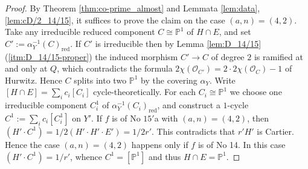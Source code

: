 \documentclass[a4paper,11pt]{amsart}
\theoremstyle{definition}
\theoremstyle{remark}
\numberwithin{equation}{section}
\newcommand{\bP}{{\mathbb P}}
\newcommand{\cO}{{\mathcal O}}
\newcommand{\red}{\mathrm{red}}
\begin{document}
\begin{proof}
By Theorem \ref{thm:co-prime_almost} and
Lemmata \ref{lem:data}, \ref{lem:cD/2_14/15},
it suffices to prove the claim on the case $(a,n)=(4,2)$.
Take any irreducible reduced component $C \cong \bP^1$ of $H \cap E$,
and set $C':=\alpha_Y^{-1}(C)_\red$.
If $C'$ is irreducible
then by Lemma \ref{lem:D_14/15}(\ref{itm:D_14/15-proper})
the induced morphism $C' \to C$ of degree $2$ is ramified at and only at $Q$,
which contradicts
the formula $2\chi(\cO_{C'})=2\cdot2\chi(\cO_C)-1$ of Hurwitz.
Hence $C$ splits into two $\bP^1$ by the covering $\alpha_Y$.
Write $[H \cap E]=\sum_ic_i[C_i]$ cycle-theoretically.
For each $C_i\cong\bP^1$
we choose one irreducible component $C_i^1$ of $\alpha_Y^{-1}(C_i)_\red$,
and construct a $1$-cycle $C^1:=\sum_ic_i[C_i^1]$ on $Y'$.
If $f$ is of No $\textrm{15}'$a with $(a,n)=(4,2)$,
then $(H' \cdot C^1)=1/2(H' \cdot H' \cdot E')=1/2r'$.
This contradicts that $r'H'$ is Cartier.
Hence the case $(a,n)=(4,2)$ happens only if $f$ is of No 14.
In this case $(H' \cdot C^1)=1/r'$,
whence $C^1=[\bP^1]$ and thus $H \cap E=\bP^1$.


\end{proof}
\end{document}
